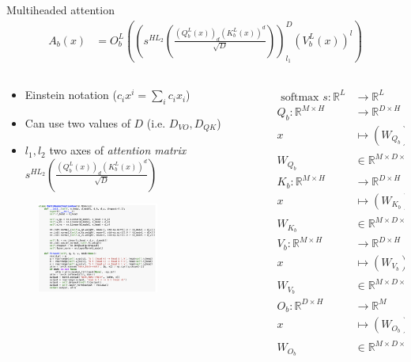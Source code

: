 \begin{frame}{Multiheaded attention}
\footnotesize
\begin{align*}
A_b (x) &= O_b^L ((s^{HL_2} ( \frac{ (Q_b^L(x))_{d}  (K_b^L(x))^d}{\sqrt{D}} ))^D_{l_1} (V_{b}^L (x))^l)
\end{align*}
\begin{columns}
\begin{column}{.5\textwidth}
\begin{itemize}
\item Einstein notation ($c_i x^i = \sum_{i} c_i x_i$)
\item Can use two values of $D$ (i.e. $D_{VO}, D_{QK}$)
\item $l_1, l_2$ two axes of {\it attention matrix} $s^{HL_2} ( \frac{ (Q_b^L(x))_{d}  (K_b^L(x))^d}{\sqrt{D}} )$
\end{itemize}
\begin{figure}
    \includegraphics[width=4cm]{img/multihead.png}
    \caption*{\citet{einops-undated-sp}}
\end{figure}
\end{column}
\begin{column}{.5\textwidth}
\tiny
\vspace{-1cm}
\begin{align*}
\text{ softmax } s : \mathbb R^{L } &\to \mathbb R^{L } \\
\hline
Q_b: \mathbb R^{M \times H} &\to \mathbb R^{D \times H} \\
x &\mapsto (W_{Q_b})_{m} x^{m} \\ 
W_{Q_b} &\in \mathbb R^{M \times D \times H} \\
\hline
K_b: \mathbb R^{M \times H} &\to \mathbb R^{D  \times H} \\
x &\mapsto (W_{K_b})_{m} x^{m} \\ 
W_{K_b} &\in \mathbb R^{M \times D \times H}\\
\hline
V_b: \mathbb R^{M  \times H} &\to \mathbb R^{D   \times H} \\
x &\mapsto (W_{V_b})_{m} x^{m} \\ 
W_{V_b} &\in \mathbb R^{M \times D \times H} \\
\hline
O_b: \mathbb R^{D \times H} &\to \mathbb R^{M} \\
x &\mapsto (W_{O_b})_{hd} x^{hd} \\ 
W_{O_b} &\in \mathbb R^{M \times D \times H} 
\end{align*}
\end{column}
\end{columns}
\end{frame}

